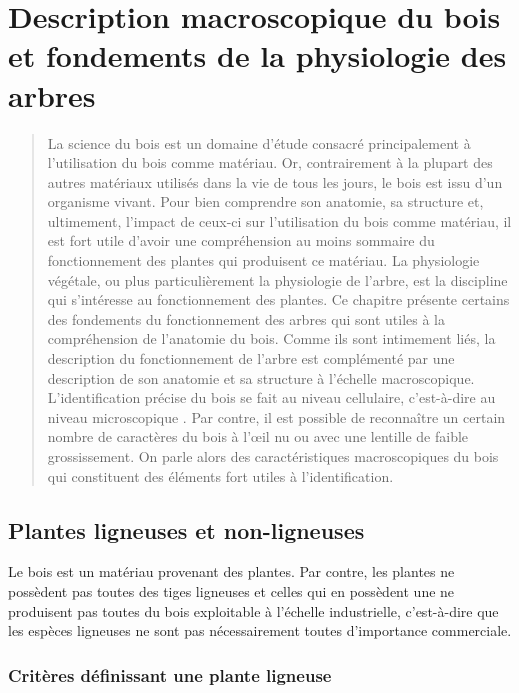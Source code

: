 \chapter{Description macroscopique du bois et fondements de la physiologie des arbres}

\begin{abstract}
La science du bois est un domaine d'étude consacré principalement à l'utilisation du bois comme matériau. Or, contrairement à la plupart des autres matériaux utilisés dans la vie de tous les jours, le bois est issu d'un organisme vivant. Pour bien comprendre son anatomie, sa structure et, ultimement, l'impact de ceux-ci sur l'utilisation du bois comme matériau, il est fort utile d'avoir une compréhension au moins sommaire du fonctionnement des plantes qui produisent ce matériau. La physiologie végétale, ou plus particulièrement la physiologie de l'arbre, est la discipline qui s'intéresse au fonctionnement des plantes. Ce chapitre présente certains des fondements du fonctionnement des arbres qui sont utiles à la compréhension de l'anatomie du bois. Comme ils sont intimement liés, la description du fonctionnement de l'arbre est complémenté par une description de son anatomie et sa structure à l'échelle macroscopique. L'identification précise du bois se fait au niveau cellulaire, c'est-à-dire au niveau \og microscopique \fg. Par contre, il est possible de reconnaître un certain nombre de caractères du bois à l'œil nu ou avec une lentille de faible grossissement. On parle alors des caractéristiques \og macroscopiques \fg du bois qui constituent des éléments fort utiles à l'identification.
\end{abstract}

\minitoc
 
\section{Plantes ligneuses et non-ligneuses} 

Le bois est un matériau provenant des plantes. Par contre, les plantes ne possèdent pas toutes des tiges ligneuses et celles qui en possèdent une ne produisent pas toutes du bois exploitable à l'échelle industrielle, c'est-à-dire que les espèces ligneuses ne sont pas nécessairement toutes d'importance commerciale. 

\subsection{Critères définissant une plante ligneuse}

